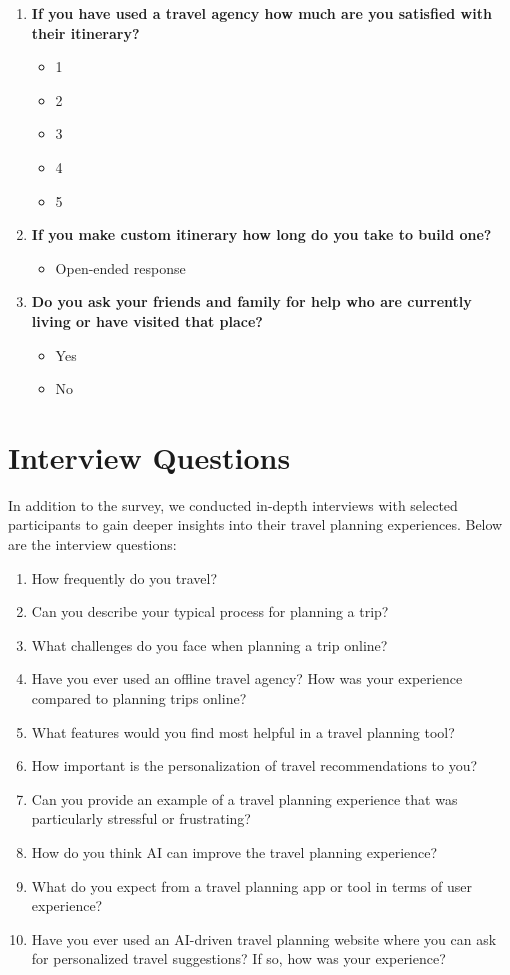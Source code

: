 \documentclass[conference]{IEEEtran}
\begin{document}
\begin{enumerate}
    \item \textbf{If you have used a travel agency how much are you satisfied with their itinerary?}
    \begin{itemize}
        \item 1
        \item 2
        \item 3
        \item 4
        \item 5
    \end{itemize}
    
    \item \textbf{If you make custom itinerary how long do you take to build one?}
    \begin{itemize}
        \item Open-ended response
    \end{itemize}
    
    \item \textbf{Do you ask your friends and family for help who are currently living or have visited that place?}
    \begin{itemize}
        \item Yes
        \item No
    \end{itemize}
\end{enumerate}

\section{Interview Questions}
In addition to the survey, we conducted in-depth interviews with selected participants to gain deeper insights into their travel planning experiences. Below are the interview questions:

\begin{enumerate}
    \item How frequently do you travel?
    \item Can you describe your typical process for planning a trip?
    \item What challenges do you face when planning a trip online?
    \item Have you ever used an offline travel agency? How was your experience compared to planning trips online?
    \item What features would you find most helpful in a travel planning tool?
    \item How important is the personalization of travel recommendations to you?
    \item Can you provide an example of a travel planning experience that was particularly stressful or frustrating?
    \item How do you think AI can improve the travel planning experience?
    \item What do you expect from a travel planning app or tool in terms of user experience?
    \item Have you ever used an AI-driven travel planning website where you can ask for personalized travel suggestions? If so, how was your experience?
\end{enumerate}
\end{document}
